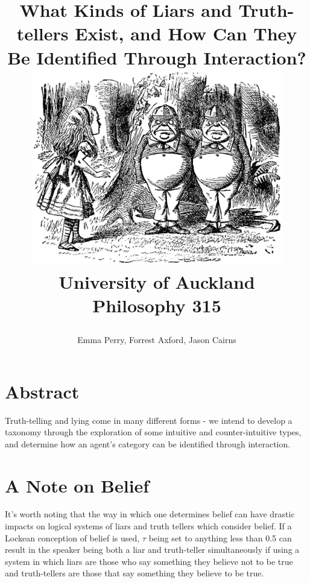 \documentclass[12pt, titlepage, twoside, a4paper]{report}
\title{
{What Kinds of Liars and Truth-tellers Exist, and How Can They Be Identified Through Interaction?} \newline \newline
{\includegraphics[width=11cm]{alice.eps}}\\
{\large University of Auckland}\\
{\large Philosophy 315}\\
\author{Emma Perry, Forrest Axford, Jason Cairns}}
\begin{document}
\maketitle
\tableofcontents
\newpage
\section*{Abstract}
Truth-telling and lying come in many different forms - we intend to develop a taxonomy through the exploration of some intuitive and counter-intuitive types, and determine how an agent's category can be identified through interaction.

\section*{A Note on Belief}
It’s worth noting that the way in which one determines belief can  have drastic impacts on logical systems of liars and truth tellers which consider belief.\autocite{sep-logic-action} If a Lockean conception of belief is used, $\tau$ being set to anything less than 0.5 can result in the speaker being both a liar and truth-teller simultaneously if using a system in which liars are those who say something they believe not to be true and truth-tellers are those that say something they believe to be true.\autocite{sep-logic-epistemic} 
\end{document}

